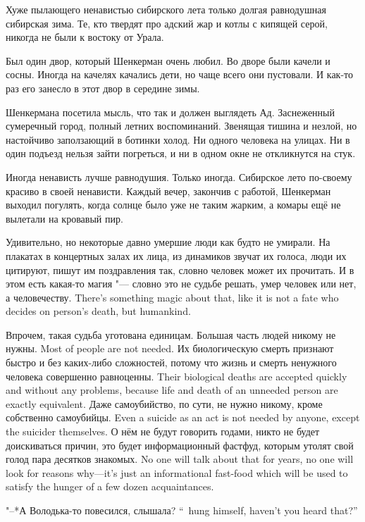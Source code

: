 Хуже пылающего ненавистью сибирского лета только долгая равнодушная сибирская зима.
Те, кто твердят про адский жар и котлы с кипящей серой, никогда не были к востоку от Урала.

Был один двор, который Шенкерман очень любил.
Во дворе были качели и сосны.
Иногда на качелях качались дети, но чаще всего они пустовали.
И как-то раз его занесло в этот двор в середине зимы.

Шенкермана посетила мысль, что так и должен выглядеть Ад.
Заснеженный сумеречный город, полный летних воспоминаний.
Звенящая тишина и незлой, но настойчиво заползающий в ботинки холод.
Ни одного человека на улицах.
Ни в один подъезд нельзя зайти погреться, и ни в одном окне не откликнутся на стук.

Иногда ненависть лучше равнодушия.
Только иногда.
Сибирское лето по-своему красиво в своей ненависти.
Каждый вечер, закончив с работой, Шенкерман выходил погулять, когда солнце было уже не таким жарким, а комары ещё не вылетали на кровавый пир.

Удивительно, но некоторые давно умершие люди как будто не умирали.
На плакатах в концертных залах их лица, из динамиков звучат их голоса, люди их цитируют, пишут им поздравления так, словно человек может их прочитать.
{И в этом есть какая-то магия "--- словно это не судьбе решать, умер человек или нет, а человечеству.}
{There's something magic about that, like it is not a fate who decides on person's death, but humankind.}

Впрочем, такая судьба уготована единицам.
{Большая часть людей никому не нужны.}
{Most of people are not needed.}
{Их биологическую смерть признают быстро и без каких-либо сложностей, потому что жизнь и смерть ненужного человека совершенно равноценны.}
{Their biological deaths are accepted quickly and without any problems, because life and death of an unneeded person are exactly equivalent.}
{Даже самоубийство, по сути, не нужно никому, кроме собственно самоубийцы.}
{Even a suicide as an act is not needed by anyone, except the suicider themselves.}
{О нём не будут говорить годами, никто не будет доискиваться причин, это будет информационный фастфуд, которым утолят свой голод пара десятков знакомых.}
{No one will talk about that for years, no one will look for reasons why---it's just an informational fast-food which will be used to satisfy the hunger of a few dozen acquaintances.}

{"--*А Володька-то повесился, слышала?}
{``\Volodka\ hung himself, haven't you heard that?''}

